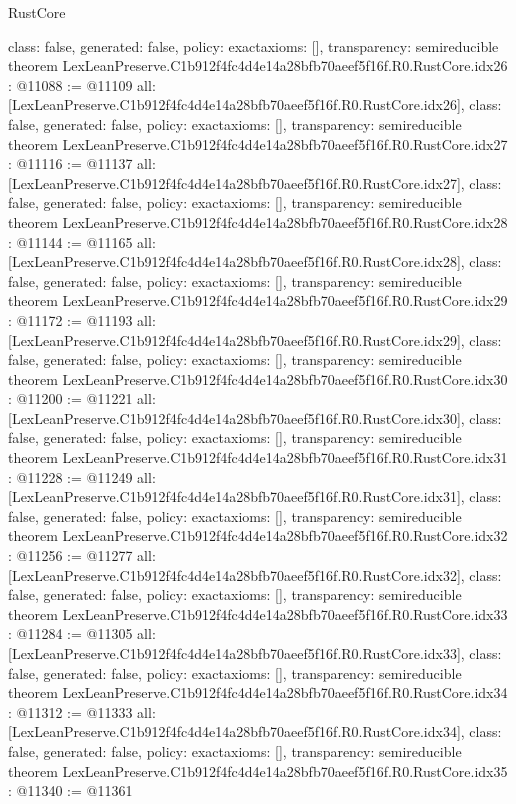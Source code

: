\begin{lexlean}{RustCore}
\begin{coremodule}
{  class: false,
  generated: false,
  policy: exact{axioms: []},
  transparency: semireducible
}
theorem LexLeanPreserve.C1b912f4fc4d4e14a28bfb70aeef5f16f.R0.RustCore.idx26 : @11088 := @11109 {
  all: [LexLeanPreserve.C1b912f4fc4d4e14a28bfb70aeef5f16f.R0.RustCore.idx26],
  class: false,
  generated: false,
  policy: exact{axioms: []},
  transparency: semireducible
}
theorem LexLeanPreserve.C1b912f4fc4d4e14a28bfb70aeef5f16f.R0.RustCore.idx27 : @11116 := @11137 {
  all: [LexLeanPreserve.C1b912f4fc4d4e14a28bfb70aeef5f16f.R0.RustCore.idx27],
  class: false,
  generated: false,
  policy: exact{axioms: []},
  transparency: semireducible
}
theorem LexLeanPreserve.C1b912f4fc4d4e14a28bfb70aeef5f16f.R0.RustCore.idx28 : @11144 := @11165 {
  all: [LexLeanPreserve.C1b912f4fc4d4e14a28bfb70aeef5f16f.R0.RustCore.idx28],
  class: false,
  generated: false,
  policy: exact{axioms: []},
  transparency: semireducible
}
theorem LexLeanPreserve.C1b912f4fc4d4e14a28bfb70aeef5f16f.R0.RustCore.idx29 : @11172 := @11193 {
  all: [LexLeanPreserve.C1b912f4fc4d4e14a28bfb70aeef5f16f.R0.RustCore.idx29],
  class: false,
  generated: false,
  policy: exact{axioms: []},
  transparency: semireducible
}
theorem LexLeanPreserve.C1b912f4fc4d4e14a28bfb70aeef5f16f.R0.RustCore.idx30 : @11200 := @11221 {
  all: [LexLeanPreserve.C1b912f4fc4d4e14a28bfb70aeef5f16f.R0.RustCore.idx30],
  class: false,
  generated: false,
  policy: exact{axioms: []},
  transparency: semireducible
}
theorem LexLeanPreserve.C1b912f4fc4d4e14a28bfb70aeef5f16f.R0.RustCore.idx31 : @11228 := @11249 {
  all: [LexLeanPreserve.C1b912f4fc4d4e14a28bfb70aeef5f16f.R0.RustCore.idx31],
  class: false,
  generated: false,
  policy: exact{axioms: []},
  transparency: semireducible
}
theorem LexLeanPreserve.C1b912f4fc4d4e14a28bfb70aeef5f16f.R0.RustCore.idx32 : @11256 := @11277 {
  all: [LexLeanPreserve.C1b912f4fc4d4e14a28bfb70aeef5f16f.R0.RustCore.idx32],
  class: false,
  generated: false,
  policy: exact{axioms: []},
  transparency: semireducible
}
theorem LexLeanPreserve.C1b912f4fc4d4e14a28bfb70aeef5f16f.R0.RustCore.idx33 : @11284 := @11305 {
  all: [LexLeanPreserve.C1b912f4fc4d4e14a28bfb70aeef5f16f.R0.RustCore.idx33],
  class: false,
  generated: false,
  policy: exact{axioms: []},
  transparency: semireducible
}
theorem LexLeanPreserve.C1b912f4fc4d4e14a28bfb70aeef5f16f.R0.RustCore.idx34 : @11312 := @11333 {
  all: [LexLeanPreserve.C1b912f4fc4d4e14a28bfb70aeef5f16f.R0.RustCore.idx34],
  class: false,
  generated: false,
  policy: exact{axioms: []},
  transparency: semireducible
}
theorem LexLeanPreserve.C1b912f4fc4d4e14a28bfb70aeef5f16f.R0.RustCore.idx35 : @11340 := @11361 {
}
\end{coremodule}
\end{lexlean}
